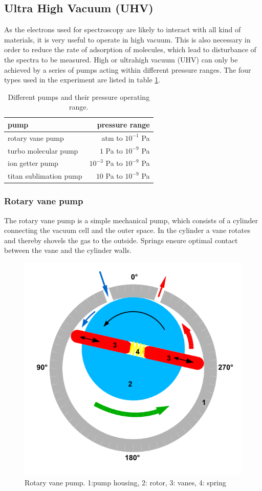 \documentclass[a4paper]{scrartcl}
\numberwithin{equation}{section}
\numberwithin{figure}{section}
\numberwithin{table}{section}
\begin{document}
\subsection{Ultra High Vacuum (UHV)}
As the electrons used for spectroscopy are likely to interact with all kind of materials, it is very useful to operate in high vacuum. This is also necessary in order to reduce the rate of adsorption of molecules, which lead to disturbance of the spectra to be measured. High or ultrahigh vacuum (UHV) can only be achieved by a series of pumps acting within different pressure ranges. The four types used in the experiment are listed in table \ref{tab:pump}.
\begin{table}
\centering
\begin{tabular}{lr}
\toprule
pump & pressure range \\
\midrule
rotary vane pump & atm to $10^{-1}$ Pa \\
turbo molecular pump &  $1$ Pa to $10^{-9}$ Pa \\
ion getter pump  & $ 10^{-3}$ Pa to $10^{-9}$ Pa \\
titan sublimation pump & $10$ Pa to $10^{-9}$ Pa \\
\bottomrule
\end{tabular}
\caption{Different pumps and their pressure operating range.}
\label{tab:pump}
\end{table}

\subsubsection{Rotary vane pump}
The rotary vane pump is a simple mechanical pump, which consists of a cylinder connecting the vacuum cell and the outer space. In the cylinder a vane rotates and thereby shovels the gas to the outside. Springs ensure optimal contact between the vane and the cylinder walls. 

\begin{figure}
  \centering
   	\includegraphics[width=0.3\linewidth]{pic/rot.png}

 \caption{\small Rotary vane pump. 1:pump housing, 2: rotor, 3: vanes, 4: spring}
        \label{fig:rot}
\end{figure}
\end{document}
